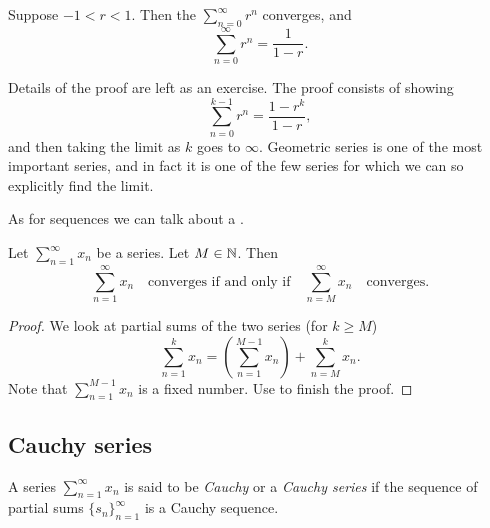 \begin{prop} \label{geometric:prop}
Suppose
$-1 < r < 1$.  Then the \emph{}
$\sum_{n=0}^\infty r^n$ converges, and
\begin{equation*}
\sum_{n=0}^\infty r^n = \frac{1}{1-r} .
\end{equation*}
\end{prop}

Details of the proof are left as an exercise.
The proof consists of showing 
\begin{equation*}
\sum_{n=0}^{k-1} r^n = \frac{1-r^k}{1-r} ,
\end{equation*}
and then taking the limit as $k$ goes to $\infty$.
Geometric series is one of the most important series, and in fact it is
one of the few series for which we can so explicitly find the limit.

\medskip

\pagebreak[2]
As for sequences we can talk about a \emph{}.

\begin{prop}
Let $\sum_{n=1}^\infty x_n$ be a series.  Let $M \in {\mathbb{N}}$.  Then
\begin{equation*}
\sum_{n=1}^\infty x_n \quad \text{converges if and only if} \quad
\sum_{n=M}^\infty x_n \quad \text{converges.}
\end{equation*}
\end{prop}

\begin{proof}
We look at partial sums of the two series (for $k \geq M$)
\begin{equation*}
\sum_{n=1}^{k} x_n
=
\left(
\sum_{n=1}^{M-1} x_n
\right)
+
\sum_{n=M}^{k} x_n .
\end{equation*}
Note that 
$\sum_{n=1}^{M-1} x_n$ is a fixed number.  Use
 to finish the proof.
\end{proof}

\subsection{Cauchy series}

\begin{defn}
A series $\sum_{n=1}^\infty x_n$ is said to be \emph{Cauchy} or a
\emph{Cauchy series}
if the sequence of partial sums $\{ s_n \}_{n=1}^\infty$ is a Cauchy sequence.
\end{defn}

